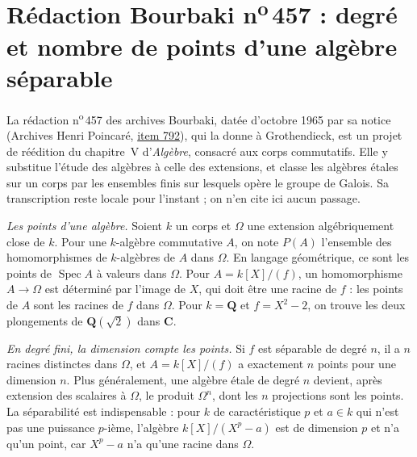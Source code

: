 \section[Rédaction Bourbaki n\textsuperscript{o}\,457 : degré et nombre de points]{Rédaction Bourbaki n\textsuperscript{o}\,457 : degré et nombre de points d'une algèbre séparable\protect{}}\label{sec:bourbaki-457}

La rédaction n\textsuperscript{o}\,457 des archives Bourbaki, datée d'octobre 1965 par sa notice (Archives Henri Poincaré, \href{https://archives-bourbaki.ahp-numerique.fr/items/show/792}{item 792}), qui la donne à Grothendieck, est un projet de réédition du chapitre~V d'\emph{Algèbre}, consacré aux corps commutatifs. Elle y substitue l'étude des algèbres à celle des extensions, et classe les algèbres étales sur un corps par les ensembles finis sur lesquels opère le groupe de Galois. Sa transcription reste locale pour l'instant ; on n'en cite ici aucun passage.

\emph{Les points d'une algèbre.} Soient $k$ un corps et $\Omega$ une extension algébriquement close de $k$. Pour une $k$-algèbre commutative $A$, on note $P(A)$ l'ensemble des homomorphismes de $k$-algèbres de $A$ dans $\Omega$. En langage géométrique, ce sont les points de $\operatorname{Spec} A$ à valeurs dans $\Omega$. Pour $A = k[X]/(f)$, un homomorphisme $A \to \Omega$ est déterminé par l'image de $X$, qui doit être une racine de $f$ : les points de $A$ sont les racines de $f$ dans $\Omega$. Pour $k = \mathbf Q$ et $f = X^2 - 2$, on trouve les deux plongements de $\mathbf Q(\sqrt 2)$ dans $\mathbf C$.

\emph{En degré fini, la dimension compte les points.} Si $f$ est séparable de degré $n$, il a $n$ racines distinctes dans $\Omega$, et $A = k[X]/(f)$ a exactement $n$ points pour une dimension $n$. Plus généralement, une algèbre étale de degré $n$ devient, après extension des scalaires à $\Omega$, le produit $\Omega^n$, dont les $n$ projections sont les points. La séparabilité est indispensable : pour $k$ de caractéristique $p$ et $a \in k$ qui n'est pas une puissance $p$-ième, l'algèbre $k[X]/(X^p - a)$ est de dimension $p$ et n'a qu'un point, car $X^p - a$ n'a qu'une racine dans $\Omega$.

